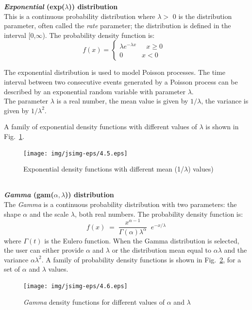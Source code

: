 \textbf{\emph{Exponential} (exp($\lambda$)) distribution}\\
 This
is a continuous probability distribution where $\lambda >$ 0 is
the distribution parameter, often called the \emph{rate}
parameter; the distribution is defined in the interval
[0,$\infty$). The probability density function is:
\[ f(x) = \left\{ \begin{array} {ll}
          \lambda e^{- \lambda x}   &   \mbox{ $x \geq 0$ } \\
          0   &   \mbox{$x < 0$}
                 \end {array}
\right.   \]

The exponential distribution is used to model Poisson processes.
The time interval between two consecutive events generated by a
Poisson process can be described by an exponential random variable
with parameter $\lambda$.\\
The parameter $\lambda$ is a real number, the mean value is
 given by $1/\lambda$, the variance is given by $1/\lambda^2$.

A family of exponential density functions with different values of
$\lambda$ is shown in Fig.~\ref{fig:famExp}.
\begin{figure}[htb]
    \begin{center}
        \texttt{[image: img/jsimg-eps/4.5.eps]}
    \end{center}
    \caption{Exponential density functions with different mean (1/$\lambda$) values)}
    \label{fig:famExp}
\end{figure}\\

\textbf{\emph{Gamma} (gam($\alpha,\lambda$)) distribution}\\
The \emph{Gamma} is a continuous probability distribution with two
parameters: the shape $\alpha$ and the scale $\lambda$, both real
numbers. The probability density function is:
\[
f(x)\; = \; \frac{x^{\alpha-1}}{\Gamma(\alpha) \lambda^\alpha} \;
\; e^{- x/\lambda}
\]
where $\Gamma(t)$ is the Eulero function. When the Gamma
distribution is selected, the user can either provide $\alpha$ and
$\lambda$ or the distribution mean equal to $\alpha \lambda$ and
the variance $\alpha \lambda^2$. A family of probability density
functions is shown in Fig.~\ref{fig:famGam}, for a set of $\alpha$
and $\lambda$ values.
\begin{figure}[htb]
    \begin{center}
        \texttt{[image: img/jsimg-eps/4.6.eps]}
    \end{center}
    \caption{\emph{Gamma} density functions for different values of $\alpha$ and $\lambda$}
    \label{fig:famGam}
\end{figure}\\

